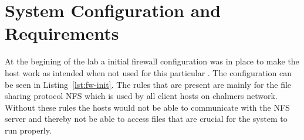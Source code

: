 \section{System Configuration and Requirements}
\label{sec:setup}




At the begining of the lab a initial firewall configuration was in place to make the host work as intended when not used for this particular \lab. The configuration can be seen in Listing~\ref{lst:fw-init}. The rules that are present are mainly for the file sharing protocol NFS which is used by all client hosts on chalmers network. Without these rules the hosts would not be able to communicate with the NFS server and thereby not be able to access files that are crucial for the system to run properly.  



